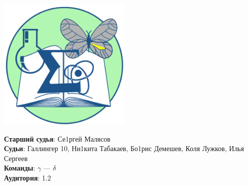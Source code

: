 \documentclass[12pt]{article}
\begin{document}
\begin{minipage}{.30\textwidth}
\begin{center}
\includegraphics[width=0.48\textwidth]{klshlogo.pdf}
\end{center}
\end{minipage}
\begin{minipage}{.65\textwidth}
\begin{flushleft}
{\bf Старший судья}: Се1ргей Малясов\\ 
{\bf Судьи}: Галлингер 10, Ни1кита Табакаев, Бо1рис Демешев, Коля Лужков, Илья Сергеев\\ 
{\bf Команды}: $\gamma$ --- $\delta$\\ 
{\bf Аудитория}: 1.2\\ 
\end{flushleft}
\end{minipage}
\end{document}
